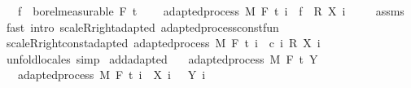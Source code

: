\begin{isabellebody}
\ \ \ {\isachardoublequoteopen}f\ {\isasymin}\ borel{\isacharunderscore}{\kern0pt}measurable\ {\isacharparenleft}{\kern0pt}F\ t\ \isanewline
\ \ \ {\isachardoublequoteopen}adapted{\isacharunderscore}{\kern0pt}process\ M\ F\ t\ {\isacharparenleft}{\kern0pt}{\isasymlambda}i\ {\isasymxi}{\isachardot}{\kern0pt}\ f\ {\isasymxi}\ {\isacharasterisk}{\kern0pt}\isactrlsub R\ {\isacharparenleft}{\kern0pt}X\ i\ {\isasymxi}{\isacharparenright}{\kern0pt}{\isacharparenright}{\kern0pt}{\isachardoublequoteclose}\isanewline
%
\isadelimproof
\ \ %
\endisadelimproof
%
\isatagproof
{}\isamarkupfalse%
\ assms\ \isamarkupfalse%
\ {\isacharparenleft}{\kern0pt}fast\ intro{\isacharcolon}{\kern0pt}\ scaleR{\isacharunderscore}{\kern0pt}right{\isacharunderscore}{\kern0pt}adapted\ adapted{\isacharunderscore}{\kern0pt}process{\isacharunderscore}{\kern0pt}const{\isacharunderscore}{\kern0pt}fun{\isacharparenright}{\kern0pt}%
\endisatagproof
{\isafoldproof}%
%
\isadelimproof
\isanewline
%
\endisadelimproof
\isanewline
{}\isamarkupfalse%
\ scaleR{\isacharunderscore}{\kern0pt}right{\isacharunderscore}{\kern0pt}const{\isacharunderscore}{\kern0pt}adapted{\isacharcolon}{\kern0pt}\ {\isachardoublequoteopen}adapted{\isacharunderscore}{\kern0pt}process\ M\ F\ t\ {\isacharparenleft}{\kern0pt}{\isasymlambda}i\ {\isasymxi}{\isachardot}{\kern0pt}\ c\ i\ {\isacharasterisk}{\kern0pt}\isactrlsub R\ {\isacharparenleft}{\kern0pt}X\ i\ {\isasymxi}{\isacharparenright}{\kern0pt}{\isacharparenright}{\kern0pt}{\isachardoublequoteclose}%
\isadelimproof
\ %
\endisadelimproof
%
\isatagproof
{}\isamarkupfalse%
\ {\isacharparenleft}{\kern0pt}unfold{\isacharunderscore}{\kern0pt}locales{\isacharparenright}{\kern0pt}\ simp%
\endisatagproof
{\isafoldproof}%
%
\isadelimproof
%
\endisadelimproof
\isanewline
\isanewline
{}\isamarkupfalse%
\ add{\isacharunderscore}{\kern0pt}adapted{\isacharcolon}{\kern0pt}\isanewline
\ \ \ {\isachardoublequoteopen}adapted{\isacharunderscore}{\kern0pt}process\ M\ F\ t\ Y{\isachardoublequoteclose}\isanewline
\ \ \ {\isachardoublequoteopen}adapted{\isacharunderscore}{\kern0pt}process\ M\ F\ t\ {\isacharparenleft}{\kern0pt}{\isasymlambda}i\ {\isasymxi}{\isachardot}{\kern0pt}\ X\ i\ {\isasymxi}\ {\isacharplus}{\kern0pt}\ Y\ i\ {\isasymxi}{\isacharparenright}{\kern0pt}{\isachardoublequoteclose}\isanewline

\end{isabellebody}
